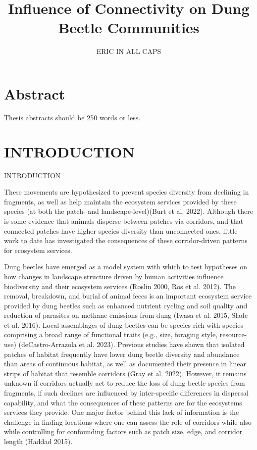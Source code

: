 \documentclass[
]{article}
\title{Influence of Connectivity on Dung Beetle Communities}
\author{ERIC IN ALL CAPS}
\date{}
\begin{document}
\maketitle

\hypertarget{abstract}{%
\section{Abstract}\label{abstract}}

Thesis abstracts should be 250 words or less.

\newpage

\hypertarget{introduction}{%
\section{INTRODUCTION}\label{introduction}}

INTRODUCTION

These movements are hypothesized to prevent species diversity from
declining in fragments, as well as help maintain the ecosystem services
provided by these species (at both the patch- and landscape-level)(Burt
et al. 2022). Although there is some evidence that animals disperse
between patches via corridors, and that connected patches have higher
species diversity than unconnected ones, little work to date has
investigated the consequences of these corridor-driven patterns for
ecosystem services.

Dung beetles have emerged as a model system with which to test
hypotheses on how changes in landscape structure driven by human
activities influence biodiversity and their ecosystem services (Roslin
2000, Rös et al. 2012). The removal, breakdown, and burial of animal
feces is an important ecosystem service provided by dung beetles such as
enhanced nutrient cycling and soil quality and reduction of parasites on
methane emissions from dung (Iwasa et al. 2015, Slade et al. 2016).
Local assemblages of dung beetles can be species-rich with species
comprising a broad range of functional traits (e.g., size, foraging
style, resource-use) (deCastro-Arrazola et al. 2023). Previous studies
have shown that isolated patches of habitat frequently have lower dung
beetle diversity and abundance than areas of continuous habitat, as well
as documented their presence in linear strips of habitat that resemble
corridors (Gray et al. 2022). However, it remains unknown if corridors
actually act to reduce the loss of dung beetle species from fragments,
if such declines are influenced by inter-specific differences in
dispersal capability, and what the consequences of these patterns are
for the ecosystems services they provide. One major factor behind this
lack of information is the challenge in finding locations where one can
assess the role of corridors while also while controlling for
confounding factors such as patch size, edge, and corridor length
(Haddad 2015).
\end{document}
